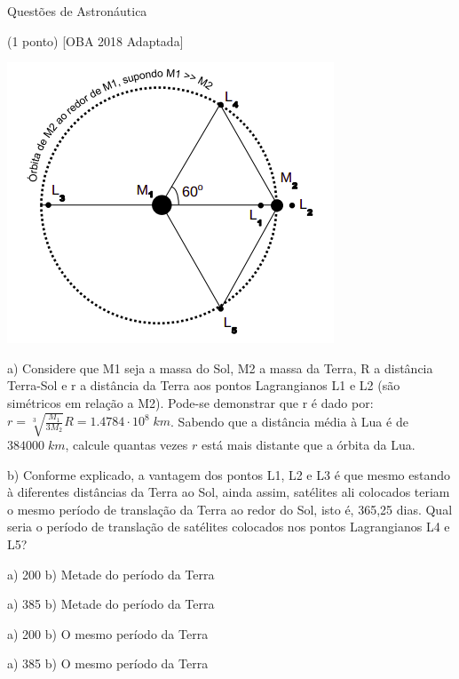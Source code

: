 \documentclass{../lista}
\begin{document}
\begin{secao}{Questões de Astronáutica}
\begin{questao}{(1 ponto) [OBA 2018 Adaptada]}
			\begin{center}
				\includegraphics[height=.75\linewidth]{./img/10.png}
			\end{center}
			
			a) Considere que M1 seja a massa do Sol, M2 a massa da Terra, R a distância Terra-Sol e r a distância da Terra aos pontos Lagrangianos L1 e L2 (são simétricos em relação a M2). Pode-se demonstrar que r é dado por: $ r = \sqrt[3]{\frac{M_{1}}{3 M_{2}}} R = 1.4784 \cdot 10^{8} \; km$. Sabendo que a distância média à Lua é de $384000 \; km$, calcule quantas vezes $r$ está mais distante que a órbita da Lua.
			
			b) Conforme explicado, a vantagem dos pontos L1, L2 e L3 é que mesmo
			estando à diferentes distâncias da Terra ao Sol, ainda assim, satélites ali colocados teriam o mesmo período de translação da Terra ao redor do Sol, isto é, 365,25 dias. Qual seria o período de translação de satélites colocados nos pontos Lagrangianos L4 e L5?
			
			\begin{alternativas}
				\item a) 200 b) Metade do período da Terra
				\item a) 385 b) Metade do período da Terra
				\item a) 200 b) O mesmo período da Terra
				\item a) 385 b) O mesmo período da Terra
			\end{alternativas}
			
		\end{questao}
	\end{secao}
\end{document}
